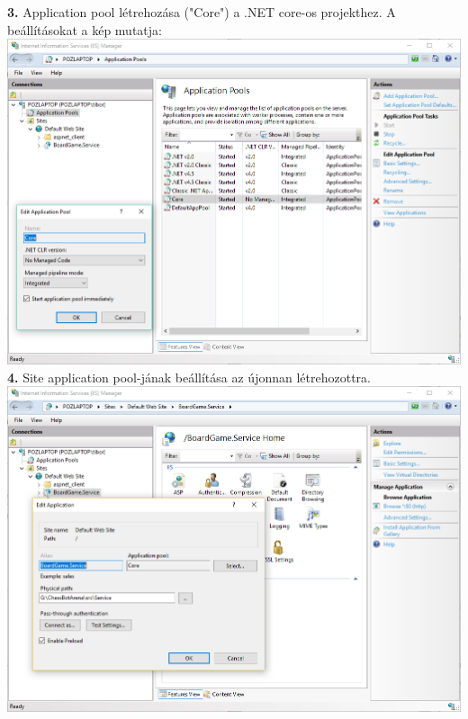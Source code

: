 \documentclass[twoside, a4paper, 12pt]{book}
\begin{document}
\noindent \textbf{3.} Application pool létrehozása ("Core") a .NET core-os projekthez. A beállításokat a kép mutatja: \\
\includegraphics[width=1.0\textwidth]{img/server_dev_run_2.png} \\

\noindent \textbf{4.} Site application pool-jának beállítása az újonnan létrehozottra.
\includegraphics[width=1.0\textwidth]{img/server_dev_run_3.png} \\
\end{document}
